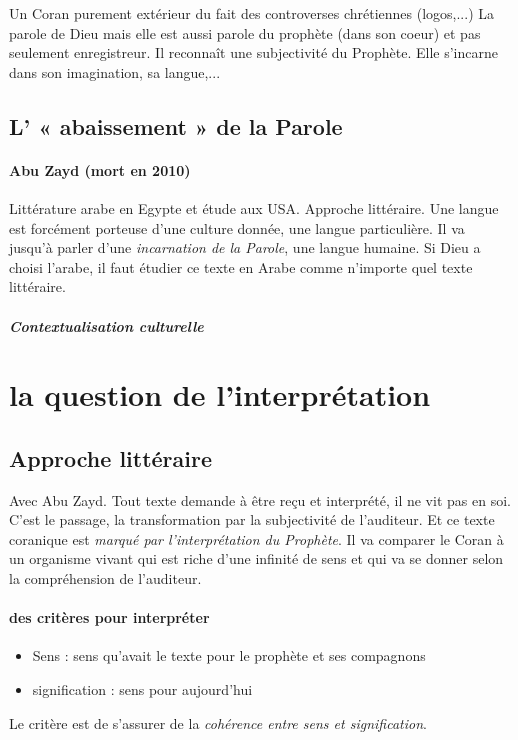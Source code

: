 \begin{Synthesis}
Un Coran purement extérieur du fait des controverses chrétiennes (logos,...)
La parole de Dieu mais elle est aussi parole du prophète (dans son coeur) et pas seulement enregistreur. Il reconnaît une subjectivité du Prophète. Elle s'incarne dans son imagination, sa langue,...
\end{Synthesis}

\subsection{L’ « abaissement » de la Parole }
\paragraph{Abu Zayd (mort en 2010)} Littérature arabe en Egypte et étude aux USA. Approche littéraire. Une langue est forcément porteuse d'une culture donnée, une langue particulière. Il va jusqu'à parler d'une \textit{incarnation de la Parole}, une langue humaine. Si Dieu a choisi l'arabe, il faut étudier ce texte en Arabe comme n'importe quel texte littéraire. 

\subparagraph{Contextualisation culturelle}

\section{la question de l'interprétation}

\subsection{Approche littéraire} 
Avec Abu Zayd.
Tout texte demande à être reçu et interprété, il ne vit pas en soi. C'est le passage, la transformation par la subjectivité de l'auditeur. Et ce texte coranique est \textit{marqué par l'interprétation du Prophète}. Il va comparer le Coran à un organisme vivant qui est riche d'une infinité de sens et qui va se donner selon la compréhension de l'auditeur.

\paragraph{des critères pour interpréter}


\begin{itemize}
    \item Sens : sens qu'avait le texte pour le prophète et ses compagnons
    \item signification : sens pour aujourd'hui
\end{itemize}
Le critère est de s'assurer de la \textit{cohérence entre sens et signification}. 


